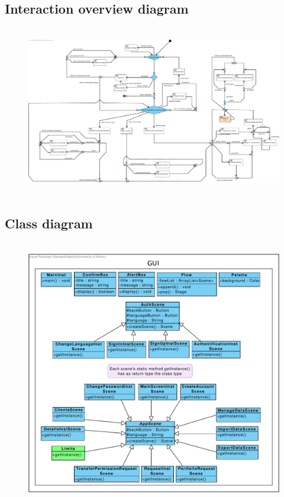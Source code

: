 \documentclass[]{report}
\begin{document}


\newpage

\subsection{Interaction overview diagram}



\begin{figure}[h!]
\hbox{
	\centering\includegraphics[scale=0.33]{img/Interaction Overview Institution - Extension 6.pdf}
}
\end{figure}

\newpage

\subsection{Class diagram}



\begin{figure}[h!]
\hbox{
	\centering\includegraphics[width=\linewidth]{img/Class Institution - Extension 6.pdf}
}
\end{figure}
\end{document}
